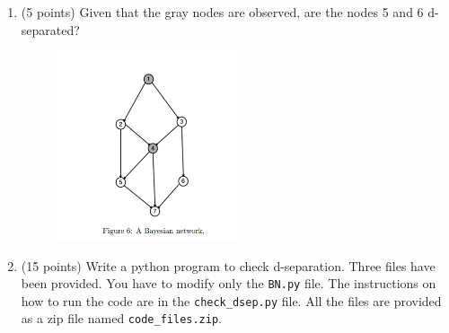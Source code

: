 \documentclass[a3paper,12pt]{extarticle} %
\begin{document}
\begin{enumerate}
\begin{figure}[h!]
        \label{fig:example_image}
    \end{figure}
    \item (5 points) Given that the gray nodes are observed, are the nodes 5 and 6 d-separated?
    \begin{figure}[h!]
        \centering
        \includegraphics[width=0.5\textwidth]{dseperation_3.png}
        \label{fig:example_image}
    \end{figure} 
    \item (15 points) Write a python program to check d-separation. Three files have been provided. You have to modify only the \texttt{BN.py} file. The instructions on how to run the code are in the \texttt{check\_dsep.py} file. All the files are provided as a zip file named \texttt{code\_files.zip}.
\end{enumerate}
\end{document}
